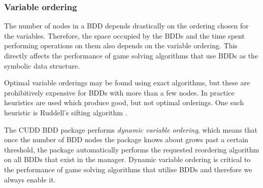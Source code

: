 \subsubsection{Variable ordering}

The number of nodes in a BDD depends drastically on the ordering chosen for the variables. Therefore, the space occupied by the BDDs and the time spent performing operations on them also depends on the variable ordering. This directly affects the performance of game solving algorithms that use BDDs as the symbolic data structure. 

Optimal variable orderings may be found using exact algorithms, but these are prohibitively expensive for BDDs with more than a few nodes. In practice heuristics are used which produce good, but not optimal orderings. One such heuristic is Ruddell's sifting algorithm \cite{Rudell_1993}.

The CUDD BDD package performs \emph{dynamic variable ordering}, which means that once the number of BDD nodes the package knows about grows past a certain threshold, the package automatically performs the requested reordering algorithm on all BDDs that exist in the manager. Dynamic variable ordering is critical to the performance of game solving algorithms that utilise BDDs and therefore we always enable it.

